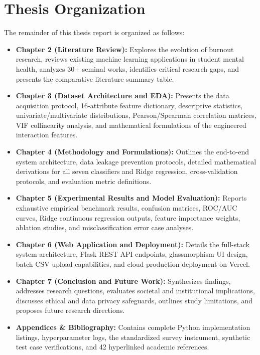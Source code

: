 \documentclass[12pt,a4paper,oneside]{report}
\begin{document}
\section{Thesis Organization}
\label{sec:organization}
The remainder of this thesis report is organized as follows:
\begin{itemize}
    \item \textbf{Chapter 2 (Literature Review):} Explores the evolution of burnout research, reviews existing machine learning applications in student mental health, analyzes 30+ seminal works, identifies critical research gaps, and presents the comparative literature summary table.
    \item \textbf{Chapter 3 (Dataset Architecture and EDA):} Presents the data acquisition protocol, 16-attribute feature dictionary, descriptive statistics, univariate/multivariate distributions, Pearson/Spearman correlation matrices, VIF collinearity analysis, and mathematical formulations of the engineered interaction features.
    \item \textbf{Chapter 4 (Methodology and Formulations):} Outlines the end-to-end system architecture, data leakage prevention protocols, detailed mathematical derivations for all seven classifiers and Ridge regression, cross-validation protocols, and evaluation metric definitions.
    \item \textbf{Chapter 5 (Experimental Results and Model Evaluation):} Reports exhaustive empirical benchmark results, confusion matrices, ROC/AUC curves, Ridge continuous regression outputs, feature importance weights, ablation studies, and misclassification error case analyses.
    \item \textbf{Chapter 6 (Web Application and Deployment):} Details the full-stack system architecture, Flask REST API endpoints, glassmorphism UI design, batch CSV upload capabilities, and cloud production deployment on Vercel.
    \item \textbf{Chapter 7 (Conclusion and Future Work):} Synthesizes findings, addresses research questions, evaluates societal and institutional implications, discusses ethical and data privacy safeguards, outlines study limitations, and proposes future research directions.
    \item \textbf{Appendices \& Bibliography:} Contains complete Python implementation listings, hyperparameter logs, the standardized survey instrument, synthetic test case verifications, and 42 hyperlinked academic references.
\end{itemize}
\end{document}

